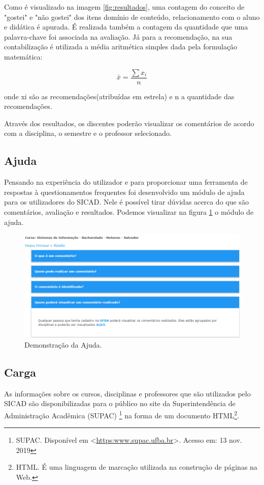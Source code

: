 \documentclass[12pt, a4paper]{report}
\begin{document}
Como é visualizado na imagem \ref{fig:resultados}, uma contagem do conceito de "gostei" e "não gostei" dos itens domínio de conteúdo, relacionamento com o aluno e didática é apurada. É realizada também a contagem da quantidade que uma palavra-chave foi associada na avaliação. Já para a recomendação, na sua contabilização é utilizada a média aritmética simples dada pela formulação matemática:

\begin{equation}
\bar{x}=\frac{\sum{x_{i}}}{n} 
\end{equation}

onde xi são as recomendações(atribuídas em estrela) e n a quantidade das recomendações.

Através dos resultados, os discentes poderão visualizar os comentários de acordo com a disciplina, o semestre e o professor selecionado.

\subsection{Ajuda}
\label{subsection:ajuda}
Pensando na experiência do utilizador e para proporcionar uma ferramenta de respostas à questionamentos frequentes foi desenvolvido um módulo de ajuda para os utilizadores do SICAD. Nele é possível tirar dúvidas acerca do que são comentários, avaliação e resultados. Podemos visualizar na figura \ref{fig:ajuda} o módulo de ajuda.

\begin{figure}
\centering
\includegraphics[scale=0.6]{ajuda.png}
\caption{Demonstração da Ajuda.}
\label{fig:ajuda}
\end{figure}

\subsection{Carga}
\label{subsection:carga}
As informações sobre os cursos, disciplinas e professores que são utilizados pelo SICAD são disponibilizadas para o público no site da Superintendência de Administração Acadêmica (SUPAC) \footnote{SUPAC. Disponível em <\url{https:www.supac.ufba.br}>. Acesso em: 13 nov. 2019} na forma de um documento HTML\footnote{HTML. É  uma linguagem de marcação utilizada na construção de páginas na Web.}.
\end{document}
